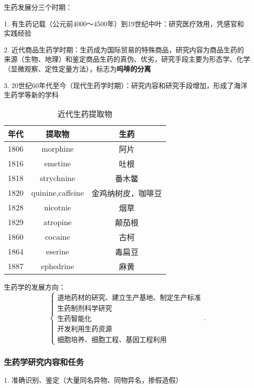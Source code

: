 \begin{notation}
    生药发展分三个时期：

    1. 有生药记载（公元前4000～4500年）到19世纪中叶：研究医疗效用，凭感官和实践经验

    2. 近代商品生药学时期：生药成为国际贸易的特殊商品，研究内容为商品生药的来源（生物、地理）和鉴定商品生药的真伪、优劣，研究手段主要为形态学、化学（显微观察、定性定量方法），标志为\textbf{吗啡的分离}

    3. 20世纪60年代至今（现代生药学时期）：研究内容和研究手段增加，形成了海洋生药学等新的学科
\end{notation}
\begin{table}[htpb]
    \centering
    \caption{近代生药提取物}
    \label{tab:近代生药提取物}
    \begin{tabular}{ccc}
    \toprule
    年代 & 提取物 & 生药 \\
    \midrule
    1806 & morphine & 阿片 \\
    1816 & emetine & 吐根\\
    1818 & strychnine & 番木鳖\\
    1820 & quinine,caffeine & 金鸡纳树皮，咖啡豆\\
    1828 & nicotnie & 烟草\\
    1829 & atropine & 颠茄根\\
    1860 & cocaine & 古柯\\
    1864 & eserine & 毒扁豆\\
    1887 & ephedrine & 麻黄\\
    \bottomrule
    \end{tabular}
\end{table}
生药学的发展方向：
\[
    \begin{cases}
        \mbox{道地药材的研究、建立生产基地、制定生产标准}\\ 
        \mbox{生药制剂科学研究}\\ 
        \mbox{生药智能化}\\ 
        \mbox{开发利用生药资源}\\ 
        \mbox{细胞培养、细胞工程、基因工程利用}
    \end{cases}
.\] 
\subsubsection*{生药学研究内容和任务}%
\label{subsub:生药学研究内容和任务}
1. 准确识别、鉴定（大量同名异物、同物异名，掺假造假）
